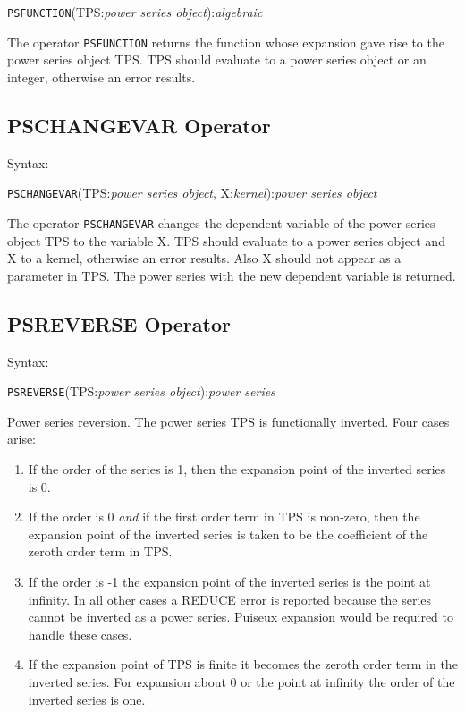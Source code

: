 \hspace*{2em}
{\tt PSFUNCTION}(TPS:{\em power series object}):{\em algebraic}

The operator {\tt PSFUNCTION} returns the function whose expansion
gave rise to the power series object TPS. TPS should
evaluate to a power series object or an integer, otherwise an error
results.

\subsection{PSCHANGEVAR Operator}

Syntax:

\hspace*{2em} {\tt PSCHANGEVAR}(TPS:{\em power series object},
X:{\em kernel}):{\em power series object}

The operator {\tt PSCHANGEVAR} changes the dependent variable of the
power series object TPS to the variable X. TPS
should evaluate to a power series object and X to a kernel,
otherwise an error results.  Also X should not appear as a
parameter in TPS. The power series with the new dependent
variable is returned.

\subsection{PSREVERSE Operator}

Syntax:

\hspace*{2em}
{\tt PSREVERSE}(TPS:{\em power series object}):{\em power series}

Power series reversion.  The power series TPS is functionally
inverted.  Four cases arise:

\begin{enumerate}
\item If the order of the series is 1, then the expansion point of the
inverted series is 0.

\item If the order is 0 {\em and} if the first order term in TPS
is non-zero, then the expansion point of the inverted series is taken
to be the coefficient of the zeroth order term in TPS.

\item If the order is -1 the expansion point of the inverted series
is the point at infinity.  In all other cases a REDUCE error is
reported because the series cannot be inverted as a power series.
Puiseux  expansion would be required to
handle these cases.

\item If the expansion point of TPS is finite it becomes the
zeroth order term in the inverted series. For expansion about 0 or the
point at infinity the order of the inverted series is one.
\end{enumerate}

